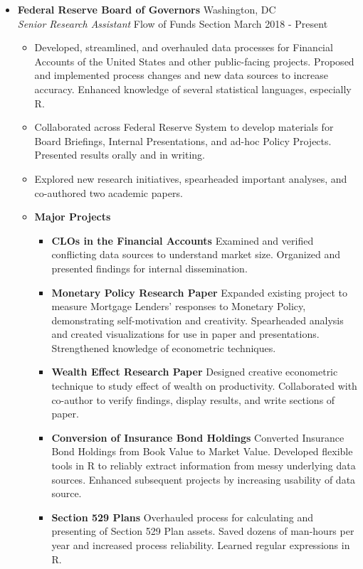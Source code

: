 \documentclass[10pt]{article} %
\begin{document}
\begin{itemize}[topsep=3pt,itemsep= 2pt,partopsep=0pt, parsep= 0pt, leftmargin = *]
	\item[]   {\bf Federal Reserve Board of Governors} \hfill{Washington, DC} \\ 
			\emph{Senior Research Assistant} {\textbullet} Flow of Funds Section \hfill {March 2018 - Present} 
		\begin{itemize}  [topsep=1pt,itemsep= 3pt,partopsep=0pt, parsep= 0pt, leftmargin = *] 
			\item Developed, streamlined, and overhauled data processes for Financial Accounts of the United States and other public-facing projects. Proposed and implemented process changes and new data sources to increase accuracy. Enhanced knowledge of several statistical languages, especially R.  
			\item Collaborated across Federal Reserve System to develop materials for Board Briefings, Internal Presentations, and ad-hoc Policy Projects. Presented results orally and in writing. 
			\item Explored new research initiatives, spearheaded important analyses, and co-authored two academic papers.
			\item[] {\bf Major Projects}
			\begin{itemize} [topsep=2pt,itemsep= 3pt,partopsep=0pt, parsep= 0pt, leftmargin = *]
					\item[] {\bf CLOs in the Financial Accounts} Examined and verified conflicting data sources to understand market size. Organized and presented findings for internal dissemination.
					\item[] {\bf Monetary Policy Research Paper} Expanded existing project to measure Mortgage Lenders' responses to Monetary Policy, demonstrating self-motivation and creativity. Spearheaded analysis and created visualizations for use in paper and presentations. Strengthened knowledge of econometric techniques.
					\item[] {\bf Wealth Effect Research Paper} Designed creative econometric technique to study effect of wealth on productivity. Collaborated with co-author to verify findings, display results, and write sections of paper.
					\item[] {\bf Conversion of Insurance Bond Holdings} Converted Insurance Bond Holdings from Book Value to Market Value. Developed flexible tools in R to reliably extract information from messy underlying data sources. Enhanced subsequent projects by increasing usability of data source.
					\item[] {\bf Section 529 Plans} Overhauled process for calculating and presenting of Section 529 Plan assets. Saved dozens of man-hours per year and increased process reliability.  Learned regular expressions in R.
			\end{itemize}
		\end{itemize}
		

\end{itemize}
\end{document}
